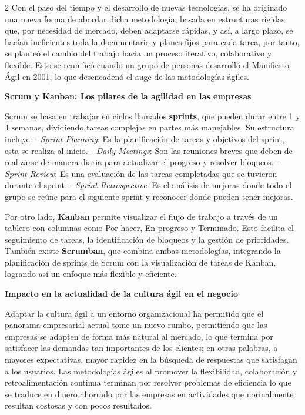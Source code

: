 \documentclass[12pt,spanish,Letterpaper,openany]{book}
\begin{document}
\begin {multicols}{2}
Con el paso del tiempo y el desarrollo de nuevas tecnologías, se ha originado una nueva forma de abordar dicha metodología, basada en estructuras rígidas que, por necesidad de mercado, deben adaptarse rápidas, y así, a largo plazo, se hacían ineficientes toda la documentario y planes fijos para cada tarea, por tanto, se planteó el cambio del trabajo hacia un proceso iterativo, colaborativo y flexible. Esto se reunificó cuando un grupo de personas desarrolló el Manifiesto Ágil en 2001, lo que desencadenó el auge de las metodologías ágiles.

\bigskip

\textbf{Scrum y Kanban: Los pilares de la agilidad en las empresas}

Scrum se basa en trabajar en ciclos llamados \textbf{sprints}, que pueden durar entre 1 y 4 semanas, dividiendo tareas complejas en partes más manejables. Su estructura incluye:
- \emph{Sprint Planning}: Es la planificación de tareas y objetivos del sprint, esta se realiza al inicio.
- \emph{Daily Meetings}: Son las reuniones breves que deben de realizarse de manera diaria para actualizar el progreso y resolver bloqueos.
- \emph{Sprint Review}: Es una evaluación de las tareas completadas que se tuvieron durante el sprint.
- \emph{Sprint Retrospective}: Es el análisis de mejoras donde todo el grupo se reúne para el siguiente sprint y reconocer donde pueden tener mejoras.

Por otro lado, \textbf{Kanban} permite visualizar el flujo de trabajo a través de un tablero con columnas como Por hacer, En progreso y Terminado. Esto facilita el seguimiento de tareas, la identificación de bloqueos y la gestión de prioridades. También existe \textbf{Scrumban}, que combina ambas metodologías, integrando la planificación de sprints de Scrum con la visualización de tareas de Kanban, logrando así un enfoque más flexible y eficiente.

\bigskip

\textbf{Impacto en la actualidad de la cultura ágil en el negocio}

Adaptar la cultura ágil a un entorno organizacional ha permitido que el panorama empresarial actual tome un nuevo rumbo, permitiendo que las empresas se adapten de forma más natural al mercado, lo que termina por satisfacer las demandas tan importantes de los clientes; en otras palabras, a mayores expectativas, mayor rapidez en la búsqueda de respuestas que satisfagan a los usuarios. Las
metodologías ágiles al promover la flexibilidad, colaboración y retroalimentación continua terminan por resolver problemas de eficiencia lo que se traduce en dinero ahorrado por las empresas en actividades que normalmente resultan costosas y con pocos resultados.


\end{multicols}
\end{document}
